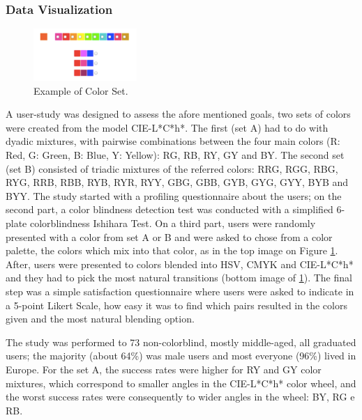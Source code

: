 \subsubsection{Data Visualization}
\label{subsubsec:datavisualization}
%
\begin{figure}
	\centering
    \vspace{-15pt}
    \includegraphics[width=0.35\textwidth]{images/background/TestDataVis.png}
    \caption[Color Blending for Data Visualization]{Example of Color Set. \protect\cite{Gama20141}}
    \label{fig:datavis}
\end{figure}
%
A user-study was designed \cite{Gama20141} to assess the afore mentioned goals, two sets of colors were created
from the model CIE-L*C*h*. The first (set A) had to do with dyadic mixtures, with pairwise combinations between
the four main colors (R: Red, G: Green, B: Blue, Y: Yellow): RG, RB, RY, GY and BY. The second set (set B) consisted
of triadic mixtures of the referred colors:
RRG, RGG, RBG, RYG, RRB, RBB, RYB, RYR, RYY, GBG, GBB, GYB, GYG, GYY, BYB and BYY. The study started with a
profiling questionnaire about the users; on the second part, a color blindness detection test was conducted
with a simplified 6-plate colorblindness Ishihara Test. On a third part, users were randomly
presented with a color from set A or B and were asked to chose from a color palette, the colors which mix
into that color, as in the top image on Figure \ref{fig:datavis}. After, users were presented to colors blended
into HSV, CMYK and CIE-L*C*h* and they had to pick the most natural transitions (bottom image of \ref{fig:datavis}).
The final step was a simple satisfaction questionnaire where users were asked to indicate in a 5-point Likert Scale,
how easy it was to find which pairs resulted in the colors given and the most natural blending option. \par
%
The study was performed to 73 non-colorblind, mostly middle-aged, all graduated users; the majority
(about 64\%) was male users and most everyone (96\%) lived in Europe. For the set A, the success rates
were higher for RY and GY color mixtures, which correspond to smaller angles in the CIE-L*C*h* color wheel,
and the worst success rates were consequently to wider angles in the wheel: BY, RG e RB.
